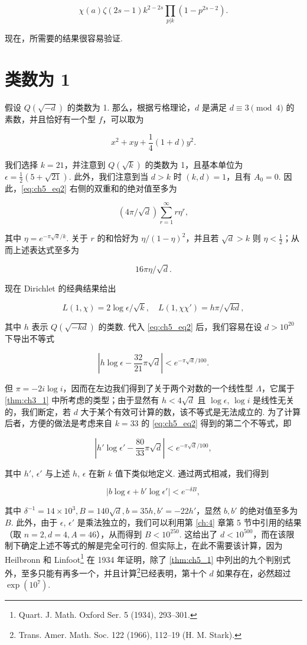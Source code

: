 \[\chi(a) \zeta(2s-1) k^{2-2s} \prod_{p|k} (1-p^{2s-2}).\]

现在，所需要的结果很容易验证.

\section{类数为 1}\label{sec:ch5_4}

假设 $Q(\sqrt{-d})$ 的类数为 1. 那么，根据亏格理论，$d$ 是满足 $d \equiv 3 \pmod 4$ 的素数，并且恰好有一个型 $f$，可以取为

\[x^2 + xy + \frac{1}{4}(1+d)y^2.\]

我们选择 $k = 21$，并注意到 $Q(\sqrt{k})$ 的类数为 1，且基本单位为 $\epsilon = \frac{1}{2}(5 + \sqrt{21})$. 此外，我们注意到当 $d > k$ 时 $(k,d) = 1$，且有 $A_0 = 0$. 因此，\eqref{eq:ch5_eq2} 右侧的双重和的绝对值至多为

\[(4\pi/\sqrt{d})\sum_{r=1}^{\infty}r\eta^{r},\]

其中 $\eta = e^{-\pi\sqrt{d}/k}$. 关于 $r$ 的和恰好为 $\eta/(1-\eta)^2$，并且若 $\sqrt{d} > k$ 则 $\eta < \frac{1}{2}$；从而上述表达式至多为

\[ 16\pi \eta / \sqrt{d}. \]

现在 Dirichlet 的经典结果给出

\[L(1,\chi) = 2\log \epsilon/\sqrt{k}, \quad L(1,\chi\chi') = h\pi/\sqrt{kd},\]

其中 $h$ 表示 $Q(\sqrt{-kd})$ 的类数. 代入 \eqref{eq:ch5_eq2} 后，我们容易在设 $d > 10^{20}$ 下导出不等式

\[\left|h\log\epsilon - \frac{32}{21}\pi\sqrt{d}\right| < e^{-\pi\sqrt{d}/100}.\]

但 $\pi = -2i\log i$，因而在左边我们得到了关于两个对数的一个线性型 $\Lambda$，它属于 \autoref{thm:ch3_1} 中所考虑的类型；由于显然有 $h < 4\sqrt{d}$ 且 $\log \epsilon$, $\log i$ 是线性无关的，我们断定，若 $d$ 大于某个有效可计算的数，该不等式是无法成立的. 为了计算后者，方便的做法是考虑来自 $k = 33$ 的 \eqref{eq:ch5_eq2} 得到的第二个不等式，即

\[ |h'\log\epsilon' - \frac{80}{33}\pi\sqrt{d}| < e^{-\pi\sqrt{d}/100}, \]

其中 $h'$, $\epsilon'$ 与上述 $h$, $\epsilon$ 在新 $k$ 值下类似地定义. 通过两式相减，我们得到

\[|b\log\epsilon + b'\log\epsilon'| < e^{-\delta B},\]

其中 $\delta^{-1} = 14 \times 10^3, B = 140\sqrt{d}, b = 35h, b' = -22h'$，显然 $b, b'$ 的绝对值至多为 $B$. 此外，由于 $\epsilon$, $\epsilon'$ 是乘法独立的，我们可以利用第 \ref{ch:4} 章第 5 节中引用的结果（取 $n=2, d=4, A=46$），从而得到 $B<10^{250}$. 这给出了 $d<10^{500}$，而在该限制下确定上述不等式的解是完全可行的. 但实际上，在此不需要该计算，因为 Heilbronn 和 Linfoot\footnote{Quart. J. Math. Oxford Ser. 5 (1934), 293--301.} 在 1934 年证明，除了 \autoref{thm:ch5_1} 中列出的九个判别式外，至多只能有再多一个，并且计算\footnote{Trans. Amer. Math. Soc. 122 (1966), 112--19 (H. M. Stark).}已经表明，第十个 $d$ 如果存在，必然超过 $\exp(10^7)$.

